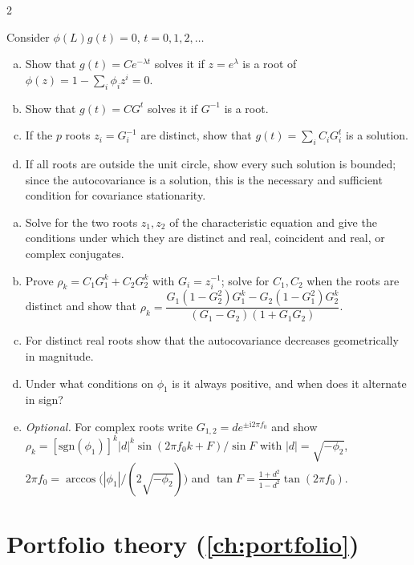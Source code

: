 \begin{paracol}{2}
\begin{exercise}\label{ch09:ex-ps4-3}
Consider $\phi(L)g(t)=0$, $t=0,1,2,\dots$
\begin{enumerate}[(a)]
  \item Show that $g(t)=Ce^{-\lambda t}$ solves it if $z=e^{\lambda}$ is a root of $\phi(z)=1-\sum_i\phi_iz^i=0$.
  \item Show that $g(t)=CG^t$ solves it if $G^{-1}$ is a root.
  \item If the $p$ roots
      $z_i=G_i^{-1}$ are distinct, show that $g(t)=\sum_iC_iG_i^t$ is a solution.
  \item If all roots are outside the unit circle, show every such solution is bounded; since the autocovariance is a solution, this is the necessary and sufficient
      condition for covariance stationarity.
\end{enumerate}
\end{exercise}

\begin{exercise}\label{ch09:ex-ar2}
\leavevmode
\begin{enumerate}[(a)]
  \item Solve for the two roots $z_1,z_2$ of the characteristic equation and give the conditions under which they are distinct and real, coincident and real, or complex conjugates.
  \item Prove $\rho_k=C_1G_1^k+C_2G_2^k$
      with $G_i=z_i^{-1}$; solve for $C_1,C_2$ when the roots are distinct and show that $\rho_k=\dfrac{G_1(1-G_2^2)G_1^k-G_2(1-G_1^2)G_2^k}{(G_1-G_2)(1+G_1G_2)}$.
  \item For distinct real roots show that the autocovariance decreases geometrically in magnitude.
  \item Under what conditions on $\phi_1$ is it always positive, and when does it alternate in sign?
  \item \emph{Optional.} For complex roots write $G_{1,2}=de^{\pm\mathrm i2\pi f_0}$ and show
      $\rho_k=[\mathrm{sgn}(\phi_1)]^k|d|^k\sin(2\pi f_0k+F)/\sin F$ with $|d|=\sqrt{-\phi_2}$, $2\pi f_0=\arccos\bigl(|\phi_1|/(2\sqrt{-\phi_2})\bigr)$ and $\tan F=\frac{1+d^2}{1-d^2}\tan(2\pi f_0)$.
\end{enumerate}
\end{exercise}

\section{Portfolio theory (\cref{ch:portfolio})}\label{exam:ch10}


\end{paracol}
